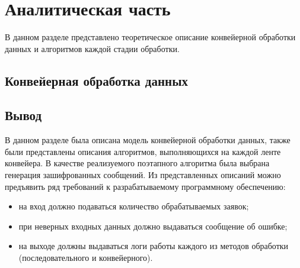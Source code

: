 \chapter{Аналитическая часть}

В данном разделе представлено теоретическое описание конвейерной обработки
данных и алгоритмов каждой стадии обработки.

\section{Конвейерная обработка данных}

\section{Вывод}

В данном разделе была описана модель конвейерной обработки данных, также были
представлены описания алгоритмов, выполняющихся на каждой ленте конвейера. В
качестве реализуемого поэтапного алгоритма была выбрана генерация зашифрованных
сообщений.  Из представленных описаний можно предъявить ряд требований к
разрабатываемому программному обеспечению:
\begin{itemize}[left=\parindent]
    \item на вход должно подаваться количество обрабатываемых заявок;
    \item при неверных входных данных должно выдаваться сообщение об ошибке;
    \item на выходе должны выдаваться логи работы каждого из методов обработки
        (последовательного и конвейерного).
\end{itemize}
